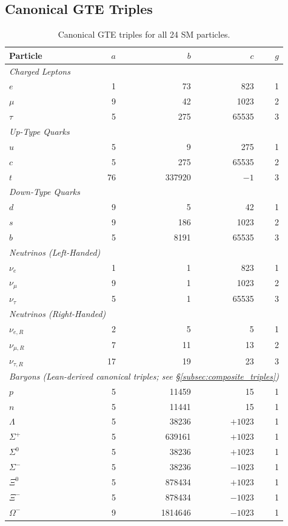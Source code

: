 \documentclass[11pt]{article}
\theoremstyle{remark}
\begin{document}
\begin{appendices}
\section{Canonical GTE Triples}
\label{app:triples}

\begin{table}[H]
\caption{Canonical GTE triples for all 24 SM particles.}
\label{tab:all_triples}
\renewcommand{\arraystretch}{1.02}
\footnotesize
\centering
\begin{tabular}{@{}l r r r r@{}}
\toprule
\textbf{Particle} & $a$ & $b$ & $c$ & $g$ \\
\midrule
\multicolumn{5}{l}{\textit{Charged Leptons}} \\
$e$ & 1 & 73 & 823 & 1 \\
$\mu$ & 9 & 42 & 1023 & 2 \\
$\tau$ & 5 & 275 & 65535 & 3 \\
\midrule
\multicolumn{5}{l}{\textit{Up-Type Quarks}} \\
$u$ & 5 & 9 & 275 & 1 \\
$c$ & 5 & 275 & 65535 & 2 \\
$t$ & 76 & 337920 & $-1$ & 3 \\
\midrule
\multicolumn{5}{l}{\textit{Down-Type Quarks}} \\
$d$ & 9 & 5 & 42 & 1 \\
$s$ & 9 & 186 & 1023 & 2 \\
$b$ & 5 & 8191 & 65535 & 3 \\
\midrule
\multicolumn{5}{l}{\textit{Neutrinos (Left-Handed)}} \\
$\nu_e$ & 1 & 1 & 823 & 1 \\
$\nu_\mu$ & 9 & 1 & 1023 & 2 \\
$\nu_\tau$ & 5 & 1 & 65535 & 3 \\
\midrule
\multicolumn{5}{l}{\textit{Neutrinos (Right-Handed)}} \\
$\nu_{e,R}$ & 2 & 5 & 5 & 1 \\
$\nu_{\mu,R}$ & 7 & 11 & 13 & 2 \\
$\nu_{\tau,R}$ & 17 & 19 & 23 & 3 \\
\midrule
\multicolumn{5}{l}{\textit{Baryons (Lean-derived canonical triples; see \S\ref{subsec:composite_triples})}} \\
$p$      & 5 & 11459   & 15      & 1 \\
$n$      & 5 & 11441   & 15      & 1 \\
$\Lambda$& 5 & 38236   & $+1023$ & 1 \\
$\Sigma^+$& 5 & 639161 & $+1023$ & 1 \\
$\Sigma^0$& 5 & 38236  & $+1023$ & 1 \\
$\Sigma^-$& 5 & 38236  & $-1023$ & 1 \\
$\Xi^0$  & 5 & 878434  & $+1023$ & 1 \\
$\Xi^-$  & 5 & 878434  & $-1023$ & 1 \\
$\Omega^-$& 9 & 1814646& $-1023$ & 1 \\
\bottomrule
\end{tabular}
\end{table}



\end{appendices}
\end{document}
